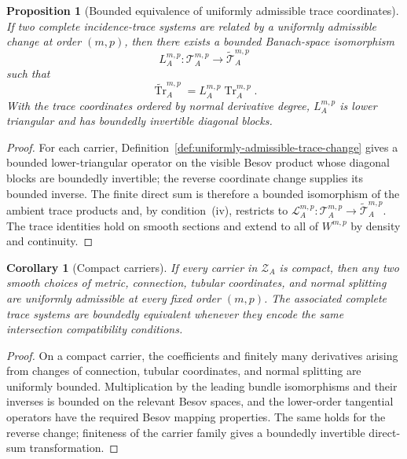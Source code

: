 \documentclass[11pt]{article}
\theoremstyle{plain}
\newtheorem{proposition}[theorem]{Proposition}
\newtheorem{corollary}[theorem]{Corollary}
\theoremstyle{definition}
\begin{document}
\begin{proposition}[Bounded equivalence of uniformly admissible trace
coordinates]
\label{prop:trace-coordinate-invariance}
If two complete incidence-trace systems are related by a uniformly
admissible change at order \((m,p)\), then there exists a bounded
Banach-space isomorphism
\[
  L_A^{m,p}:
  \mathcal T_A^{m,p}
  \longrightarrow
  \widetilde{\mathcal T}_A^{m,p}
\]
such that
\[
  \widetilde{\operatorname{Tr}}_A^{m,p}
  =
  L_A^{m,p}\operatorname{Tr}_A^{m,p}.
\]
With the trace coordinates ordered by normal derivative degree,
\(L_A^{m,p}\) is lower triangular and has boundedly invertible
diagonal blocks.
\end{proposition}

\begin{proof}
For each carrier, Definition~\ref{def:uniformly-admissible-trace-change} gives a bounded lower-triangular operator on the visible Besov product whose diagonal blocks are boundedly invertible; the reverse coordinate change supplies its bounded inverse. The finite direct sum is therefore a bounded isomorphism of the ambient trace products and, by condition~\textup{(iv)}, restricts to \(\mathcal L_A^{m,p}:\mathcal T_A^{m,p}\to\widetilde{\mathcal T}_A^{m,p}\). The trace identities hold on smooth sections and extend to all of \(W^{m,p}\) by density and continuity.
\end{proof}

\begin{corollary}[Compact carriers]
\label{cor:compact-trace-coordinate-invariance}
If every carrier in \(\mathscr Z_A\) is compact, then any two smooth
choices of metric, connection, tubular coordinates, and normal
splitting are uniformly admissible at every fixed order \((m,p)\).
The associated complete trace systems are boundedly
equivalent whenever they encode the same intersection compatibility
conditions.
\end{corollary}

\begin{proof}
On a compact carrier, the coefficients and finitely many derivatives arising from changes of connection, tubular coordinates, and normal splitting are uniformly bounded. Multiplication by the leading bundle isomorphisms and their inverses is bounded on the relevant Besov spaces, and the lower-order tangential operators have the required Besov mapping properties. The same holds for the reverse change; finiteness of the carrier family gives a boundedly invertible direct-sum transformation.
\end{proof}
\end{document}
